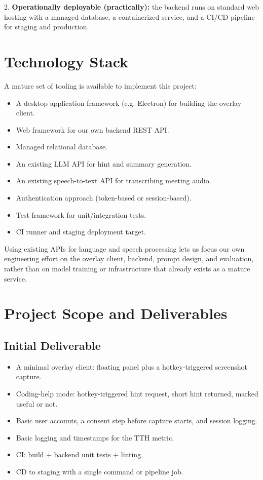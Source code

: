 \documentclass[11pt]{article}
\begin{document}
2. \textbf{Operationally deployable (practically):} the backend runs on standard web hosting
with a managed database, a containerized service, and a CI/CD pipeline for staging and
production.

\section{Technology Stack}
A mature set of tooling is available to implement this project:
\begin{itemize}
  \item A desktop application framework (e.g. Electron) for building the overlay client.
  \item Web framework for our own backend REST API.
  \item Managed relational database.
  \item An existing LLM API for hint and summary generation.
  \item An existing speech-to-text API for transcribing meeting audio.
  \item Authentication approach (token-based or session-based).
  \item Test framework for unit/integration tests.
  \item CI runner and staging deployment target.
\end{itemize}
Using existing APIs for language and speech processing lets us focus our own engineering
effort on the overlay client, backend, prompt design, and evaluation, rather than on model
training or infrastructure that already exists as a mature service.

\section{Project Scope and Deliverables}

\subsection{Initial Deliverable}
\begin{itemize}
  \item A minimal overlay client: floating panel plus a hotkey-triggered screenshot capture.
  \item Coding-help mode: hotkey-triggered hint request, short hint returned, marked useful
    or not.
  \item Basic user accounts, a consent step before capture starts, and session logging.
  \item Basic logging and timestamps for the TTH metric.
  \item CI: build + backend unit tests + linting.
  \item CD to staging with a single command or pipeline job.
\end{itemize}
\end{document}
